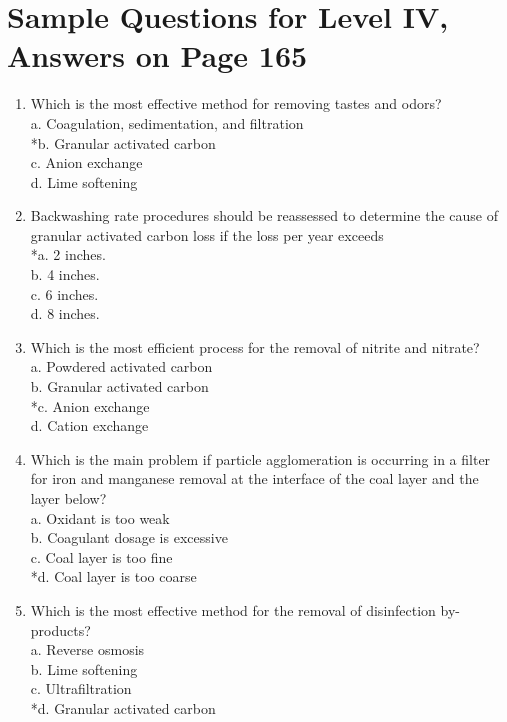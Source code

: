 \section{Sample Questions for Level IV, Answers on Page 165}
\begin{enumerate}[label=TIV-\arabic*]
  \item Which is the most effective method for removing tastes and odors?\\
a. Coagulation, sedimentation, and filtration\\
*b. Granular activated carbon\\
c. Anion exchange\\
d. Lime softening\\
  \item Backwashing rate procedures should be reassessed to determine the cause of granular activated carbon loss if the loss per year exceeds\\
*a. 2 inches.\\
b. 4 inches.\\
c. 6 inches.\\
d. 8 inches.\\
  \item Which is the most efficient process for the removal of nitrite and nitrate?\\
a. Powdered activated carbon\\
b. Granular activated carbon\\
*c. Anion exchange\\
d. Cation exchange\\
  \item Which is the main problem if particle agglomeration is occurring in a filter for iron and manganese removal at the interface of the coal layer and the layer below?\\
a. Oxidant is too weak\\
b. Coagulant dosage is excessive\\
c. Coal layer is too fine\\
*d. Coal layer is too coarse\\
  \item Which is the most effective method for the removal of disinfection by-products?\\
a. Reverse osmosis\\
b. Lime softening\\
c. Ultrafiltration\\
*d. Granular activated carbon\\
\end{enumerate}
